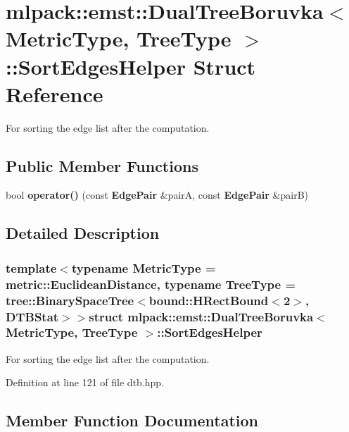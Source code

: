 \section{mlpack\-:\-:emst\-:\-:Dual\-Tree\-Boruvka$<$ Metric\-Type, Tree\-Type $>$\-:\-:Sort\-Edges\-Helper Struct Reference}
\label{structmlpack_1_1emst_1_1DualTreeBoruvka_1_1SortEdgesHelper}


For sorting the edge list after the computation.  


\subsection*{Public Member Functions}
\begin{DoxyCompactItemize}
\item 
bool {\bf operator()} (const {\bf Edge\-Pair} \&pair\-A, const {\bf Edge\-Pair} \&pair\-B)
\end{DoxyCompactItemize}


\subsection{Detailed Description}
\subsubsection*{template$<$typename Metric\-Type = metric\-::\-Euclidean\-Distance, typename Tree\-Type = tree\-::\-Binary\-Space\-Tree$<$bound\-::\-H\-Rect\-Bound$<$2$>$, D\-T\-B\-Stat$>$$>$struct mlpack\-::emst\-::\-Dual\-Tree\-Boruvka$<$ Metric\-Type, Tree\-Type $>$\-::\-Sort\-Edges\-Helper}

For sorting the edge list after the computation. 

Definition at line 121 of file dtb.\-hpp.



\subsection{Member Function Documentation}
